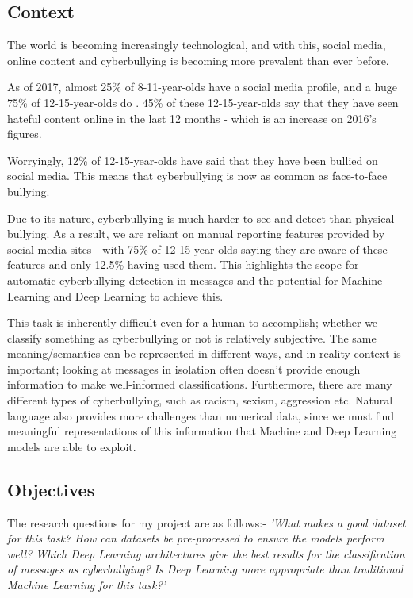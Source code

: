\documentclass[12pt,a4paper]{article}
\begin{document}
\subsection{Context}
The world is becoming increasingly technological, and with this, social media, online content and cyberbullying is becoming more prevalent than ever before. 
 
As of 2017, almost 25\% of 8-11-year-olds have a social media profile, and a huge 75\% of 12-15-year-olds do \cite[p.5]{Ofcom}. 45\% of these 12-15-year-olds say that they have seen hateful content online in the last 12 months - which is an increase on 2016's figures.

Worryingly, 12\% of 12-15-year-olds have said that they have been bullied on social media. This means that cyberbullying is now as common as face-to-face bullying.

Due to its nature, cyberbullying is much harder to see and detect than physical bullying. As a result, we are reliant on manual reporting features provided by social media sites - with 75\% of 12-15 year olds saying they are aware of these features \cite[p.5]{Ofcom} and only 12.5\% having used them. This highlights the scope for automatic cyberbullying detection in messages and the potential for Machine Learning and Deep Learning to achieve this.

This task is inherently difficult even for a human to accomplish; whether we classify something as cyberbullying or not is relatively subjective. The same meaning/semantics can be represented in different ways, and in reality context is important; looking at messages in isolation often doesn't provide enough information to make well-informed classifications. Furthermore, there are many different types of cyberbullying, such as racism, sexism, aggression etc. Natural language also provides more challenges than numerical data, since we must find meaningful representations of this information that Machine and Deep Learning models are able to exploit.



\subsection{Objectives}
The research questions for my project are as follows:- \newline
\textit{'What makes a good dataset for this task? How can datasets be pre-processed to ensure the models perform well? Which Deep Learning architectures give the best results for the classification of messages as cyberbullying? Is Deep Learning more appropriate than traditional Machine Learning for this task?'} \newline
\end{document}
